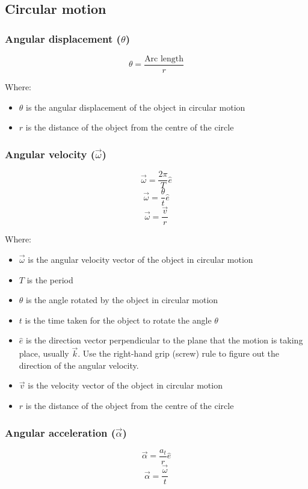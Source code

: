 \documentclass[11pt]{article}
\begin{document}
 \newpage
\subsection{Circular motion}
\label{sec:org221177a}

\subsubsection{Angular displacement (\(\theta\))}
\label{sec:orgbeeaa22}
\[\theta = \frac{\text{Arc length}}{r}\]

Where:
\begin{itemize}
\item \(\theta\) is the angular displacement of the object in circular motion
\item \(r\) is the distance of the object from the centre of the circle
\end{itemize}
\subsubsection{Angular velocity (\(\vec{\omega}\))}
\label{sec:org0e87f41}
\[\vec{\omega} = \frac{2 \pi}{T} \hat{e}\]
\[\vec{\omega} = \frac{\theta}{t} \hat{e}\]
\[\vec{\omega} = \frac{\vec{v}}{r}\]

Where:
\begin{itemize}
\item \(\vec{\omega}\) is the angular velocity vector of the object in circular motion
\item \(T\) is the period
\item \(\theta\) is the angle rotated by the object in circular motion
\item \(t\) is the time taken for the object to rotate the angle \(\theta\)
\item \(\hat{e}\) is the direction vector perpendicular to the plane that the motion is taking place, usually \(\vec{k}\). Use the right-hand grip (screw) rule to figure out the direction of the angular velocity.
\item \(\vec{v}\) is the velocity vector of the object in circular motion
\item \(r\) is the distance of the object from the centre of the circle
\end{itemize}

 \newpage
\subsubsection{Angular acceleration (\(\vec{\alpha}\))}
\label{sec:org8255b7a}
\[\vec{\alpha} = \frac{a_t}{r} \hat{e}\]
\[\vec{\alpha} = \frac{\vec{\omega}}{t}\]
\end{document}
